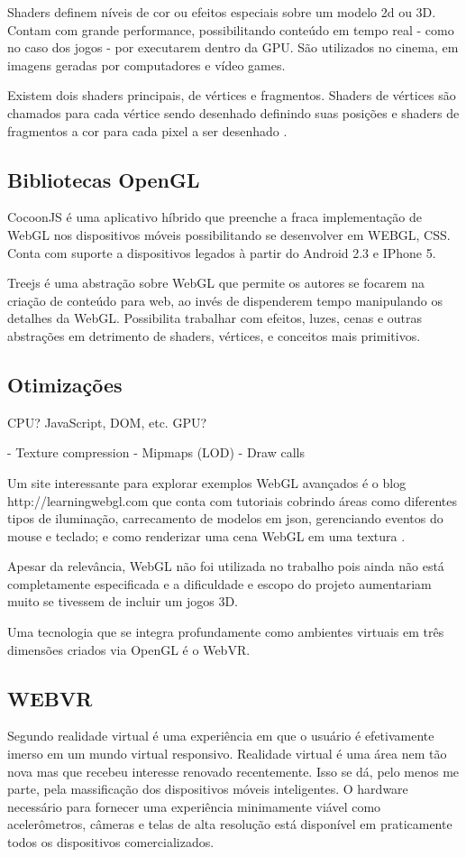Shaders definem níveis de cor ou efeitos especiais sobre um modelo 2d
ou 3D. Contam com grande performance, possibilitando conteúdo em tempo
real - como no caso dos jogos - por executarem dentro da GPU.
São utilizados no cinema, em imagens geradas por computadores e vídeo games.

Existem dois shaders principais, de vértices e fragmentos.
Shaders de vértices são chamados para cada vértice sendo desenhado
definindo suas posições e shaders de fragmentos a cor para cada pixel
a ser desenhado \autocite[pp.15]{3daps}.

\subsection{Bibliotecas OpenGL}

CocoonJS é uma aplicativo híbrido que preenche a fraca implementação
de WebGL nos dispositivos móveis possibilitando se desenvolver em
WEBGL, CSS. Conta com suporte a dispositivos legados à partir do
Android 2.3 e IPhone 5.

Treejs é uma abstração sobre WebGL que permite os autores se focarem
na criação de conteúdo para web, ao invés de dispenderem tempo manipulando
os detalhes da WebGL. Possibilita trabalhar com efeitos, luzes, cenas
e outras abstrações em detrimento de shaders, vértices, e conceitos mais
primitivos.

\subsection{Otimizações}
CPU? JavaScript, DOM, etc.
GPU?

- Texture compression
- Mipmaps (LOD)
- Draw calls

Um site interessante para explorar exemplos WebGL avançados é o blog
http://learningwebgl.com que conta com tutoriais cobrindo áreas como
diferentes tipos de iluminação, carrecamento de modelos em json,
gerenciando eventos do mouse e teclado; e como renderizar uma cena WebGL
em uma textura \autocite[pp.42]{3daps}.

Apesar da relevância, WebGL não foi utilizada no trabalho pois ainda
não está completamente especificada e a dificuldade e escopo do
projeto aumentariam muito se tivessem de incluir um jogos 3D.

Uma tecnologia que se integra profundamente como ambientes virtuais
em três dimensões criados via OpenGL é o WebVR.
\subsection{WEBVR}
Segundo \cite{virtualReality} realidade virtual é uma experiência em
que o usuário é efetivamente imerso em um mundo virtual responsivo.
Realidade virtual é uma área nem tão nova mas que recebeu interesse
renovado recentemente. Isso se dá, pelo menos me parte, pela
massificação dos dispositivos móveis inteligentes. O hardware
necessário para fornecer uma experiência minimamente viável como
acelerômetros, câmeras e telas de alta resolução está disponível
em praticamente todos os dispositivos comercializados.

